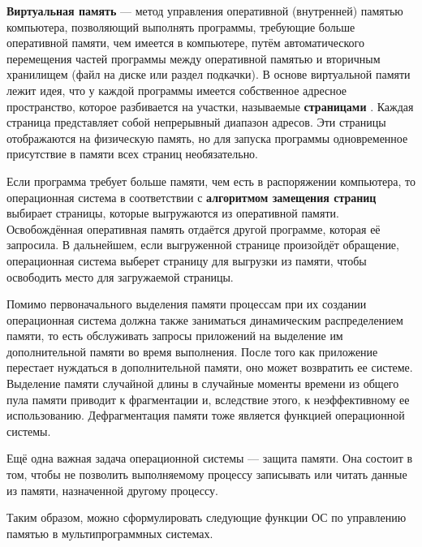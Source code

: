 \textbf{Виртуальная память} --- метод управления оперативной (внутренней) памятью компьютера, позволяющий выполнять программы, требующие больше оперативной памяти, чем имеется в компьютере, путём автоматического перемещения частей программы между оперативной памятью и вторичным хранилищем (файл на диске или раздел подкачки). В основе виртуальной памяти лежит идея, что у каждой программы имеется собственное адресное пространство, которое разбивается на участки, называемые \textbf{страницами} \cite{tannenbaum}. Каждая страница представляет собой непрерывный диапазон адресов. Эти страницы отображаются на физическую память, но для запуска программы одновременное присутствие в памяти всех страниц необязательно.

Если программа требует больше памяти, чем есть в распоряжении компьютера, то операционная система в соответствии с \textbf{алгоритмом замещения страниц} \cite{tannenbaum} выбирает страницы, которые выгружаются из оперативной памяти. Освобождённая оперативная память отдаётся другой программе, которая её запросила. В дальнейшем, если выгруженной странице произойдёт обращение, операционная система выберет страницу для выгрузки из памяти, чтобы освободить место для загружаемой страницы.


Помимо первоначального выделения памяти процессам при их создании операционная система должна также заниматься динамическим распределением памяти, то есть обслуживать запросы приложений на выделение им дополнительной памяти во время выполнения. После того как приложение перестает нуждаться в дополнительной памяти, оно может возвратить ее системе. Выделение памяти случайной длины в случайные моменты времени из общего пула памяти приводит к фрагментации и, вследствие этого, к неэффективному ее использованию. Дефрагментация памяти тоже является функцией операционной системы.

Ещё одна важная задача операционной системы --- защита памяти. Она состоит в том, чтобы не позволить выполняемому процессу записывать или читать данные из памяти, назначенной другому процессу.

Таким образом, можно сформулировать следующие функции ОС по управлению памятью в мультипрограммных системах.

